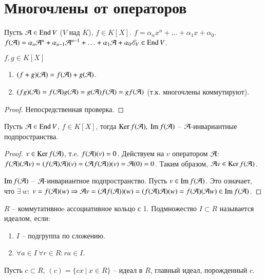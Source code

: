 \documentclass[main]{subfiles}
\begin{document}
\chapter{Многочлены от операторов}

Пусть $\mathcal{A} \in \operatorname{End} V$ ($V$ над $K$), $f \in K[X]$. $f = \alpha_n x^n + \ldots + \alpha_1 x + \alpha_0$.
$f(\mathcal{A}) = \alpha_n  {\mathcal{A}}^n + \alpha_{n-1} {\mathcal{A}}^{n-1} + \ldots + \alpha_1 \mathcal{A} + \alpha_0 \mathscr{E}_V \in \operatorname{End} V$.

\begin{proposition}
    $f, g \in K[X]$
    \begin{enumerate}
        \item $(f+g)(\mathcal{A}) = f(\mathcal{A}) + g(\mathcal{A})$.
        \item $(fg)(\mathcal{A}) = f(\mathcal{A})g(\mathcal{A}) =g(\mathcal{A})f(\mathcal{A})=gf(\mathcal{A})$ (т.к. многочлены коммутируют).
    \end{enumerate}
\end{proposition}

\begin{proof}
    Непосредственная проверка.
\end{proof}

\begin{corollary}
    Пусть $\mathcal{A} \in \operatorname{End} V$, $f \in K[X]$, тогда $\operatorname{Ker} f(\mathcal{A}), \ \operatorname{Im} f(\mathcal{A})$ -- $\mathcal{A}$-инвариантные подпространства.
\end{corollary}

\begin{proof}
    $v \in \operatorname{Ker} f(\mathcal{A})$, т.e. $f(\mathcal{A}) (v) = 0$. Действуем на $v$ оператором $\mathcal{A}$: $f(\mathcal{A})(\mathcal{A} v) =
        (f(\mathcal{A})\mathcal{A})(v) = (\mathcal{A} f(\mathcal{A}))(v) = \mathcal{A}(0) = 0$.
    Таким образом, $\mathcal{A} v \in \operatorname{Ker} f(\mathcal{A})$.

    $\operatorname{Im} f(\mathcal{A})$ -- $\mathcal{A}$-инвариантное подпространство.
    Пусть $v \in \operatorname{Im} f(\mathcal{A})$. Это означает, что $\exists \ w$: $v = f(\mathcal{A})(w) \Rightarrow
        \mathcal{A} v = (\mathcal{A} f(\mathcal{A}))(w) = (f(\mathcal{A})\mathcal{A})(w) = f(\mathcal{A})(\mathcal{A} w) \in \operatorname{Im} f(\mathcal{A})$.
\end{proof}

$R$ -- коммутативноe ассоциативное кольцо с 1. Подмножество $I\subset R$ называется идеалом, если:
\begin{enumerate}
    \item $I$ -- подгруппа по сложению.
    \item $\forall a \in I \ \forall r \in R : ra \in I$.
\end{enumerate}

Пусть $c \subset R$, $(c) = \{cx  \ | \ x \in R\}$ -- идеал в $R$, главный идеал, порожденный $c$.
\end{document}
